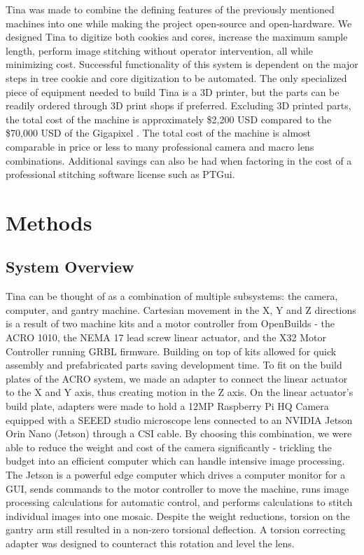 \documentclass[a4paper,12pt]{article}
\begin{document}
Tina was made to combine the defining features of the previously mentioned machines into one while making the project open-source and open-hardware. 
We designed Tina to digitize both cookies and cores, increase the maximum sample length, perform image stitching without operator intervention, all while minimizing cost. 
Successful functionality of this system is dependent on the major steps in tree cookie and core digitization to be automated. 
The only specialized piece of equipment needed to build Tina is a 3D printer, but the parts can be readily ordered through 3D print shops if preferred.
Excluding 3D printed parts, the total cost of the machine is approximately \$2,200 USD compared to the \$70,000 USD of the Gigapixel \citep{griffin_gigapixel_2021}.
The total cost of the machine is almost comparable in price or less to many professional camera and macro lens combinations.
Additional savings can also be had when factoring in the cost of a professional stitching software license such as PTGui. 

\section{Methods}

\subsection{System Overview} %

Tina can be thought of as a combination of multiple subsystems: the camera, computer, and gantry machine. 
Cartesian movement in the X, Y and Z directions is a result of two machine kits and a motor controller from OpenBuilds - the ACRO 1010, the NEMA 17 lead screw linear actuator, and the X32 Motor Controller running GRBL firmware. 
Building on top of kits allowed for quick assembly and prefabricated parts saving development time. 
To fit on the build plates of the ACRO system, we made an adapter to connect the linear actuator to the X and Y axis, thus creating motion in the Z axis.
On the linear actuator's build plate, adapters were made to hold a 12MP Raspberry Pi HQ Camera equipped with a SEEED studio microscope lens connected to an NVIDIA Jetson Orin Nano (Jetson) through a CSI cable.
By choosing this combination, we were able to reduce the weight and cost of the camera significantly - trickling the budget into an efficient computer which can handle intensive image processing. 
The Jetson is a powerful edge computer which drives a computer monitor for a GUI, sends commands to the motor controller to move the machine, runs image processing calculations for automatic control, and performs calculations to stitch individual images into one mosaic. 
Despite the weight reductions, torsion on the gantry arm still resulted in a non-zero torsional deflection. A torsion correcting adapter was designed to counteract this rotation and level the lens.
\end{document}
